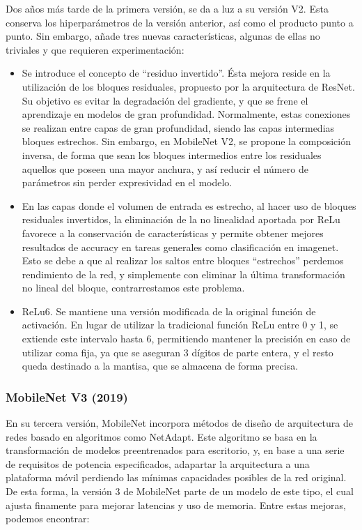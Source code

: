 Dos años más tarde de la primera versión, se da a luz a su versión V2. Esta conserva los hiperparámetros  de la versión anterior, así como el producto punto a punto. Sin embargo, añade tres nuevas características, algunas de ellas no triviales y que requieren experimentación:
\begin{itemize}
    \item Se introduce el concepto de ``residuo invertido''. Ésta mejora reside en la utilización de los bloques residuales, propuesto por la arquitectura de ResNet. Su objetivo es evitar la degradación del gradiente, y que se frene el aprendizaje en modelos de gran profundidad. Normalmente, estas conexiones se realizan entre capas de gran profundidad, siendo las capas intermedias bloques estrechos. Sin embargo, en MobileNet V2, se propone la composición inversa, de forma que sean los bloques intermedios entre los residuales aquellos que poseen una mayor anchura, y así reducir el número de parámetros sin perder expresividad en el modelo.
     \item En las capas donde el volumen de entrada es estrecho, al hacer uso de bloques residuales invertidos, la eliminación de la no linealidad aportada por ReLu favorece a la conservación de características y permite obtener mejores resultados de accuracy en tareas generales como clasificación en imagenet. Esto se debe a que al realizar los saltos entre bloques ``estrechos'' perdemos rendimiento de la red, y simplemente con eliminar la última transformación no lineal del bloque, contrarrestamos este problema.
    \item ReLu6. Se mantiene una versión modificada de la original función de activación. En lugar de utilizar la tradicional función ReLu entre 0 y 1, se extiende este intervalo hasta 6, permitiendo mantener la precisión en caso de utilizar coma fija, ya que se aseguran 3 dígitos de parte entera, y el resto queda destinado a la mantisa, que se almacena de forma precisa.
\end{itemize}

\subsubsection{MobileNet V3 (2019)}

En su tercera versión, MobileNet incorpora métodos de diseño de arquitectura de redes basado en algoritmos como NetAdapt. Este algoritmo se basa en la transformación de modelos preentrenados para escritorio, y, en base a una serie de requisitos de potencia especificados, adapartar la arquitectura a una plataforma móvil perdiendo las mínimas capacidades posibles de la red original. De esta forma, la versión 3 de MobileNet parte de un modelo de este tipo, el cual ajusta finamente para mejorar latencias y uso de memoria. Entre estas mejoras, podemos encontrar:

